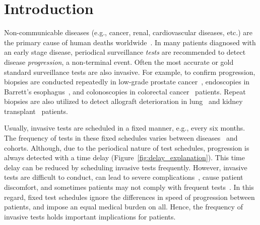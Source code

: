 \section{Introduction}
\label{sec:introduction}
Non-communicable diseases (e.g., cancer, renal, cardiovascular diseases, etc.) are the primary cause of human deaths worldwide~\citep{alwan2010monitoring}. In many patients diagnosed with an early stage disease, periodical surveillance \textit{tests} are recommended to detect disease \textit{progression}, a non-terminal event. Often the most accurate or gold standard surveillance tests are also invasive. For example, to confirm progression, biopsies are conducted repeatedly in low-grade prostate cancer~\citep{bokhorst2015compliance}, endoscopies in Barrett's esophagus~\citep{streitz1993endoscopic}, and colonoscopies in colorectal cancer~\citep{krist2007timing} patients. Repeat biopsies are also utilized to detect allograft deterioration in lung~\citep{mcwilliams2008surveillance} and kidney transplant~\citep{henderson2011surveillance} patients.

Usually, invasive tests are scheduled in a fixed manner, e.g., every six months. The frequency of tests in these fixed schedules varies between diseases~\citep{henderson2011surveillance,bokhorst2015compliance,krist2007timing} and cohorts. Although, due to the periodical nature of test schedules, progression is always detected with a time delay (Figure~\ref{fig:delay_explanation}). This time delay can be reduced by scheduling invasive tests frequently. However, invasive tests are difficult to conduct, can lead to severe complications~\citep{loeb2013systematic,krist2007timing}, cause patient discomfort, and sometimes patients may not comply with frequent tests~\citep{bokhorst2015compliance}. In this regard, fixed test schedules ignore the differences in speed of progression between patients, and impose an equal medical burden on all. Hence, the frequency of invasive tests holds important implications for patients.

